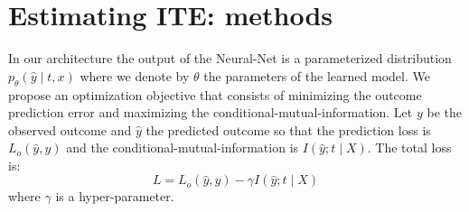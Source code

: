 \documentclass[oneside,12pt]{article}
\begin{document}
\section*{Estimating ITE: methods}\label{sec:alg}
In our architecture the output of the Neural-Net is a parameterized distribution $p_\theta(\hat{y} \mid t,x)$ where we denote by $\theta$ the parameters of the learned model. We propose an optimization objective that consists of minimizing the outcome prediction error and maximizing the conditional-mutual-information. Let $y$ be the observed outcome and $\hat{y}$ the predicted outcome so that the prediction loss is $L_o(\hat{y}, y)$ and the conditional-mutual-information is $I(\hat{y};t \mid X)$. The total loss is:
\begin{equation}\label{eq:loss}
    L = L_o(\hat{y}, y) - \gamma I(\hat{y};t \mid X)
\end{equation}
where $\gamma$ is a hyper-parameter.\\
\end{document}

